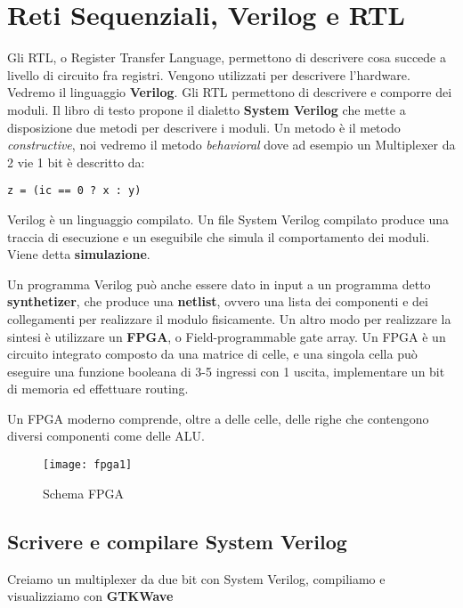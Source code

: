\chapter{Reti Sequenziali, Verilog e RTL}

Gli RTL, o Register Transfer Language, permettono di descrivere cosa succede a livello di circuito fra registri. Vengono utilizzati per descrivere l'hardware. Vedremo il linguaggio \textbf{Verilog}. Gli RTL permettono di descrivere e comporre dei moduli. Il libro di testo propone il dialetto \textbf{System Verilog} che mette a disposizione due metodi per descrivere i moduli. Un metodo è il metodo \textit{constructive}, noi vedremo il metodo \textit{behavioral} dove ad esempio un Multiplexer da 2 vie 1 bit è descritto da:
\begin{lstlisting}[style={verilog}]
	z = (ic == 0 ? x : y)
\end{lstlisting}

Verilog è un linguaggio compilato. Un file System Verilog compilato produce una traccia di esecuzione e un eseguibile che simula il comportamento dei moduli. Viene detta \textbf{simulazione}.

Un programma Verilog può anche essere dato in input a un programma detto \textbf{synthetizer}, che produce una \textbf{netlist}, ovvero una lista dei componenti e dei collegamenti per realizzare il modulo fisicamente. Un altro modo per realizzare la sintesi è utilizzare un \textbf{FPGA}, o Field-programmable gate array. Un FPGA è un circuito integrato composto da una matrice di celle, e una singola cella può eseguire una funzione booleana di 3-5 ingressi con 1 uscita, implementare un bit di memoria ed effettuare routing.

Un FPGA moderno comprende, oltre a delle celle, delle righe che contengono diversi componenti come delle ALU.

\begin{figure}[H]
	\centering
	\texttt{[image: fpga1]}
	\caption{Schema FPGA}
\end{figure}

\section{Scrivere e compilare System Verilog}

Creiamo un multiplexer da due bit con System Verilog, compiliamo e visualizziamo con \textbf{GTKWave}


